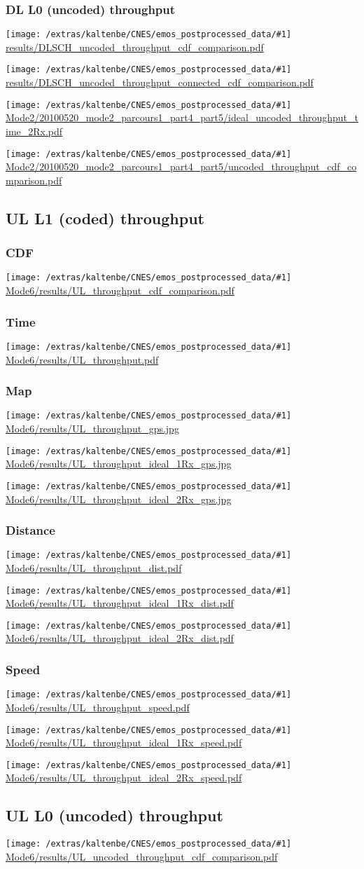 \documentclass[a4paper,10pt]{article}
\newcommand{\printfile}[1]{
 \begin{minipage}{8cm}
  \centering
  \texttt{[image: /extras/kaltenbe/CNES/emos\_postprocessed\_data/\#1]}
  \url{#1}

 \end{minipage}
}
\begin{document}
\subsubsection{DL L0 (uncoded) throughput}

\printfile{results/DLSCH_uncoded_throughput_cdf_comparison.pdf}
\printfile{results/DLSCH_uncoded_throughput_connected_cdf_comparison.pdf}

\printfile{Mode2/20100520_mode2_parcours1_part4_part5/ideal_uncoded_throughput_time_2Rx.pdf}
\printfile{Mode2/20100520_mode2_parcours1_part4_part5/uncoded_throughput_cdf_comparison.pdf}

\subsection{UL L1 (coded) throughput}

\subsubsection{CDF}
\printfile{Mode6/results/UL_throughput_cdf_comparison.pdf}

\subsubsection{Time}
\printfile{Mode6/results/UL_throughput.pdf}

\subsubsection{Map}
\printfile{Mode6/results/UL_throughput_gps.jpg}

\printfile{Mode6/results/UL_throughput_ideal_1Rx_gps.jpg}
\printfile{Mode6/results/UL_throughput_ideal_2Rx_gps.jpg}

\subsubsection{Distance}
\printfile{Mode6/results/UL_throughput_dist.pdf}

\printfile{Mode6/results/UL_throughput_ideal_1Rx_dist.pdf}
\printfile{Mode6/results/UL_throughput_ideal_2Rx_dist.pdf}


\subsubsection{Speed}
\printfile{Mode6/results/UL_throughput_speed.pdf}

\printfile{Mode6/results/UL_throughput_ideal_1Rx_speed.pdf}
\printfile{Mode6/results/UL_throughput_ideal_2Rx_speed.pdf}



\subsection{UL L0 (uncoded) throughput}

\printfile{Mode6/results/UL_uncoded_throughput_cdf_comparison.pdf}
\end{document}
